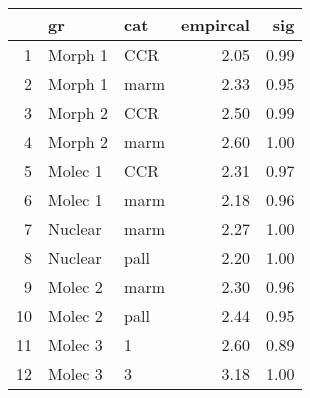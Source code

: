 \begin{table}[ht]
\centering
\begin{tabular}{rllrr}
  \hline
 & gr & cat & empircal & sig \\ 
  \hline
1 & Morph 1 & CCR & 2.05 & 0.99 \\ 
  2 & Morph 1 & marm & 2.33 & 0.95 \\ 
  3 & Morph 2 & CCR & 2.50 & 0.99 \\ 
  4 & Morph 2 & marm & 2.60 & 1.00 \\ 
  5 & Molec 1 & CCR & 2.31 & 0.97 \\ 
  6 & Molec 1 & marm & 2.18 & 0.96 \\ 
  7 & Nuclear & marm & 2.27 & 1.00 \\ 
  8 & Nuclear & pall & 2.20 & 1.00 \\ 
  9 & Molec 2 & marm & 2.30 & 0.96 \\ 
  10 & Molec 2 & pall & 2.44 & 0.95 \\ 
  11 & Molec 3 & 1 & 2.60 & 0.89 \\ 
  12 & Molec 3 & 3 & 3.18 & 1.00 \\ 
   \hline
\end{tabular}
\label{llmiss}
\end{table}
